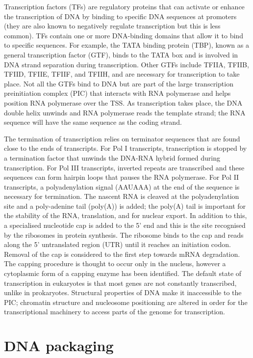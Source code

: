Transcription factors (TFs) are regulatory proteins that can activate or enhance the transcription of DNA by binding to specific DNA sequences at promoters (they are also known to negatively regulate transcription but this is less common). TFs contain one or more DNA-binding domains that allow it to bind to specific sequences. For example, the TATA binding protein (TBP), known as a general transcription factor (GTF), binds to the TATA box and is involved in DNA strand separation during transcription. Other GTFs include TFIIA, TFIIB, TFIID, TFIIE, TFIIF, and TFIIH, and are necessary for transcription to take place. Not all the GTFs bind to DNA but are part of the large transcription preinitiation complex (PIC) that interacts with RNA polymerase and helps position RNA polymerase over the TSS. As transcription takes place, the DNA double helix unwinds and RNA polymerase reads the template strand; the RNA sequence will have the same sequence as the coding strand.

The termination of transcription relies on terminator sequences that are found close to the ends of transcripts. For Pol I transcripts, transcription is stopped by a termination factor that unwinds the DNA-RNA hybrid formed during transcription. For Pol III transcripts, inverted repeats are transcribed and these sequences can form hairpin loops that pauses the RNA polymerase. For Pol II transcripts, a polyadenylation signal (AAUAAA) at the end of the sequence is necessary for termination\cite{pmid3479794}. The nascent RNA is cleaved at the polyadenylation site and a poly-adenine tail (poly(A)) is added; the poly(A) tail is important for the stability of the RNA, translation, and for nuclear export. In addition to this, a specialised nucleotide cap is added to the 5' end and this is the site recognised by the ribosomes in protein synthesis. The ribosome binds to the cap and reads along the 5' untranslated region (UTR) until it reaches an initiation codon. Removal of the cap is considered to the first step towards mRNA degradation. The capping procedure is thought to occur only in the nucleus, however a cytoplasmic form of a capping enzyme has been identified\cite{pmid22921400}. The default state of transcription in eukaryotes is that most genes are not constantly transcribed, unlike in prokaryotes. Structural properties of DNA make it inaccessible to the PIC; chromatin structure and nucleosome positioning are altered in order for the transcriptional machinery to access parts of the genome for transcription.

\section{DNA packaging}


